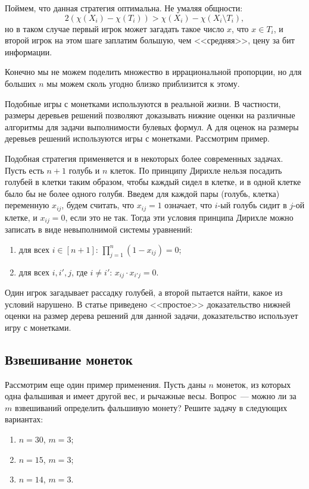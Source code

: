 Поймем, что данная стратегия оптимальна. Не умаляя общности:
$$
    2 (\chi(X_i) - \chi(T_i)) > \chi(X_i) - \chi(X_i \setminus T_i),
$$
но в таком случае первый игрок может загадать такое число $x$, что $x \in T_i$, и второй игрок на этом
шаге заплатим большую, чем <<средняя>>, цену за бит информации.

\begin{remark}
    Конечно мы не можем поделить множество в иррациональной пропорции, но для больших $n$ мы можем сколь
    угодно близко приблизится к этому.
\end{remark}


Подобные игры с монетками используются в реальной жизни. В частности, размеры деревьев решений позволяют
доказывать нижние оценки на различные алгоритмы для задачи выполнимости булевых формул. А для оценок на
размеры деревьев решений используются игры с монетками. Рассмотрим пример.

\begin{example}
	Подобная стратегия применяется и в некоторых более современных задачах. Пусть есть $n + 1$ голубь и
    $n$ клеток. По принципу Дирихле нельзя посадить голубей в клетки таким образом, чтобы каждый сидел в
    клетке, и в одной клетке было бы не более одного голубя. Введем для каждой пары (голубь, клетка)
    переменную $x_{ij}$, будем считать, что  $x_{ij} = 1$ означает, что $i$-ый голубь сидит в $j$-ой
    клетке, и $x_{ij} = 0$, если это не так. Тогда эти условия принципа Дирихле можно записать в виде
    невыполнимой системы уравнений:
    \begin{enumerate}
        \item для всех $i \in [n + 1]$: $\prod\limits_{j = 1}^{n}(1 - x_{ij}) = 0$;
        \item для всех $i, i', j$, где $i \neq i'$: $x_{ij} \cdot x_{i'j} = 0$.
    \end{enumerate}

    Один игрок загадывает рассадку голубей, а второй пытается найти, какое из условий нарушено. В статье
    \cite{BeyGalLau10} приведено <<простое>> доказательство нижней оценки на размер дерева решений для
    данной задачи, доказательство использует игру с монетками.
\end{example}


\subsection{Взвешивание монеток}
\label{sec:fake-coin}

Рассмотрим еще один пример применения. Пусть даны $n$ монеток, из которых одна фальшивая и имеет другой
вес, и рычажные весы. Вопрос~--- можно ли за $m$ взвешиваний определить фальшивую монету? Решите задачу
в следующих вариантах:
\begin{enumerate}
    \item $n = 30$, $m = 3$;
  	\item $n = 15$, $m = 3$;
    \item $n = 14$, $m = 3$.
\end{enumerate}

